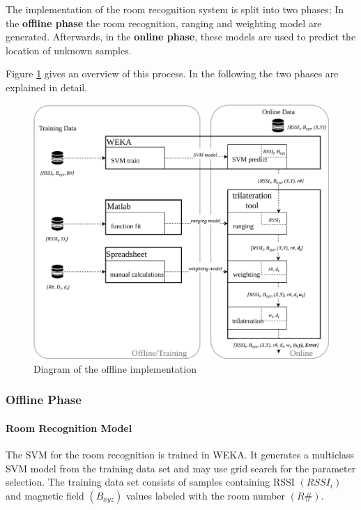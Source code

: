 The implementation of the room recognition system is split into two phases; 
In the \textbf{offline phase} the room recognition, ranging and weighting model are generated. Afterwards, in the \textbf{online phase}, these models are used to predict the location of unknown samples.

Figure \ref{fig:offlineImplementation} gives an overview of this process. In the following the two phases are explained in detail.

\begin{figure}[ht]
\centering
\includegraphics[width=\textwidth]{Figures/Offline_Set-Up}
\decoRule
\caption[Test bed offline implementation]{Diagram of the offline implementation}
\label{fig:offlineImplementation}
\end{figure}

\subsubsection{Offline Phase}

\paragraph{Room Recognition Model}
The SVM for the room recognition is trained in WEKA. It generates a multiclass SVM model from the training data set and may use grid search for the parameter selection. The training data set consists of samples containing RSSI \((RSSI_{i})\) and magnetic field \((B_{xyz})\) values labeled with the room number \((R\#)\).

